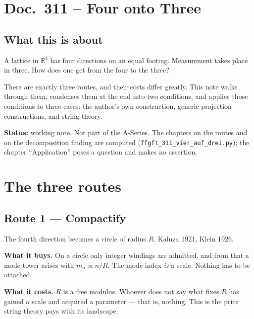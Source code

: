 \maketitle
\tableofcontents

\chapter*{Doc.~311 -- Four onto Three}

\section*{What this is about}

A lattice in $\mathbb{R}^4$ has four directions on an equal footing.
Measurement takes place in three. How does one get from the four to the
three?

There are exactly three routes, and their costs differ greatly. This
note walks through them, condenses them at the end into two conditions,
and applies those conditions to three cases: the author's own
construction, generic projection constructions, and string theory.

\medskip
\noindent\textbf{Status:} working note. Not part of the A-Series. The
chapters on the routes and on the decomposition finding are computed
(\texttt{ffgft\_311\_vier\_auf\_drei.py}); the chapter
\enquote{Application} poses a question and makes no assertion.

\chapter{The three routes}

\section{Route 1 --- Compactify}

The fourth direction becomes a circle of radius $R$. Kaluza 1921,
Klein 1926.

\textbf{What it buys.} On a circle only integer windings are admitted,
and from that a mode tower arises with $m_n \propto n/R$. The mode
index \emph{is} a scale. Nothing has to be attached.

\textbf{What it costs.} $R$ is a free modulus. Whoever does not say
what fixes $R$ has gained a scale and acquired a parameter --- that is,
nothing. This is the price string theory pays with its landscape.

